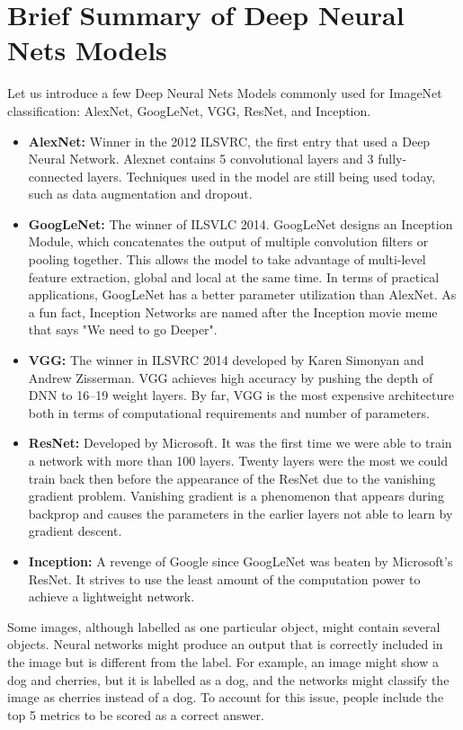 \section{Brief Summary of Deep Neural Nets Models}
Let us introduce a few Deep Neural Nets Models commonly used for ImageNet classification: AlexNet, GoogLeNet, VGG, ResNet, and Inception.
\begin{itemize}
    \item \textbf{AlexNet:}  Winner in the 2012 ILSVRC, the first entry that used a Deep Neural Network. Alexnet contains 5 convolutional layers and 3 fully-connected layers. Techniques used in the model are still being used today, such as data augmentation and dropout.
    \item \textbf{GoogLeNet:} The winner of ILSVLC 2014. GoogLeNet designs an Inception Module, which concatenates the output of multiple convolution filters or pooling together.  This allows the model to take advantage of multi-level feature extraction, global and local at the same time. In terms of practical applications, GoogLeNet has a better parameter utilization than AlexNet. As a fun fact, Inception Networks are named after the Inception movie meme that says "We need to go Deeper".
    \item \textbf{VGG:}  The winner in ILSVRC 2014 developed by Karen Simonyan and Andrew Zisserman. VGG achieves high accuracy by pushing the depth of DNN to 16--19 weight layers. By far, VGG is the most expensive architecture both in terms of computational requirements and number of parameters.
    \item \textbf{ResNet:} Developed by Microsoft. It was the first time we were able to train a network with more than 100 layers. Twenty layers were the most we could train back then before the appearance of the ResNet due to the vanishing gradient problem. Vanishing gradient is a phenomenon that appears during backprop and causes the parameters in the earlier layers not able to learn by gradient descent.
    \item \textbf{Inception:} A revenge of Google since GoogLeNet was beaten by Microsoft's ResNet. It strives to use the least amount of the computation power to achieve a lightweight network.
\end{itemize}

Some images, although labelled as one particular object, might contain several objects. Neural networks might produce an output that is correctly included in the image but is different from the label. For example, an image might show a dog and cherries, but it is labelled as a dog, and the networks might classify the image as cherries instead of a dog. To account for this issue, people include the top 5 metrics to be scored as a correct answer.

